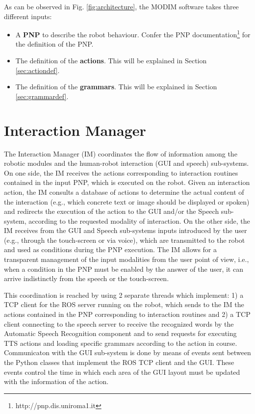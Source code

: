 \documentclass[11pt,a4paper]{article}
\begin{document}
As can be observed in Fig. \ref{fig:architecture}, the MODIM software takes three different inputs: 
\begin{itemize}
\item A \textbf{PNP} to describe the robot behaviour. Confer the PNP documentation\footnote{http://pnp.dis.uniroma1.it} for the definition of the PNP.
\item The definition of the \textbf{actions}. This will be explained in Section \ref{sec:actiondef}.
\item The definition of the \textbf{grammars}. This will be explained in Section \ref{sec:grammardef}.
\end{itemize}

\section{Interaction Manager}
\label{sec:IM}
The Interaction Manager (IM) coordinates the flow of information among the robotic modules and the human-robot interaction (GUI and speech) sub-systems. On one side, the IM receives the actions corresponding to interaction routines contained in the input PNP, which is executed on the robot. Given an interaction action, the IM consults a database of actions to determine the actual content of the interaction (e.g., which concrete text or image should be displayed or spoken) and redirects the execution of the action to the GUI and/or the Speech sub-system, according to the requested modality of interaction. On the other side, the IM receives from the GUI and Speech sub-systems inputs introduced by the user (e.g., through the touch-screen or via voice), which are transmitted to the robot and used as conditions during the PNP execution. The IM allows for a transparent management of the input modalities from the user point of view, i.e., when a condition in the PNP must be enabled by the answer of the user, it can arrive indistinctly from the speech or the touch-screen.

This coordination is reached by using 2 separate threads which implement: 1) a TCP client for the ROS server running on the robot, which sends to the IM the actions contained in the PNP corresponding to interaction routines and 2) a TCP client connecting to the speech server to receive the recognized words by the Automatic Speech Recognition component and to send requests for executing TTS actions and loading specific grammars according to the action in course. Communicaton with the GUI sub-system is done by means of events sent between the Python classes that implement the ROS TCP client and the GUI. These events control the time in which each area of the GUI layout must be updated with the information of the action.
\end{document}
